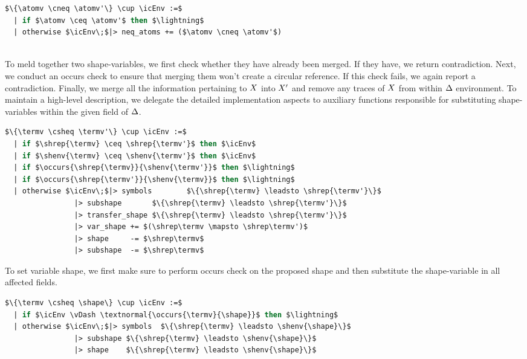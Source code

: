 \documentclass[english, mgr]{iithesis}
\renewcommand{\tt}[1]{\texttt{\small{#1}}}
\begin{document}
\begin{minipage}{0.6\textwidth}
\begin{lstlisting}[mathescape, language=OCaml]
$\{\atomv \cneq \atomv'\} \cup \icEnv :=$
  | if $\atomv \ceq \atomv'$ then $\lightning$
  | otherwise $\icEnv\;$|> neq_atoms += ($\atomv \cneq \atomv'$)
\end{lstlisting}
\end{minipage}
\\
To meld together two shape-variables, we first check whether they have already been merged. If they have, we return contradiction.
Next, we conduct an occurs check to ensure that merging them won't create a circular reference. If this check fails, we again report a contradiction.
Finally, we merge all the information pertaining to $X$ into $X'$ and
remove any traces of $X$ from within $\Delta$ environment.
To maintain a high-level description, we delegate the detailed implementation aspects to auxiliary functions responsible for substituting shape-variables within the given field of $\Delta$.
\begin{lstlisting}[mathescape, language=OCaml]
$\{\termv \csheq \termv'\} \cup \icEnv :=$
  | if $\shrep{\termv} \ceq \shrep{\termv'}$ then $\icEnv$
  | if $\shenv{\termv} \ceq \shenv{\termv'}$ then $\icEnv$
  | if $\occurs{\shrep{\termv}}{\shenv{\termv'}}$ then $\lightning$
  | if $\occurs{\shrep{\termv'}}{\shenv{\termv}}$ then $\lightning$
  | otherwise $\icEnv\;$|> symbols        $\{\shrep{\termv} \leadsto \shrep{\termv'}\}$
                |> subshape       $\{\shrep{\termv} \leadsto \shrep{\termv'}\}$
                |> transfer_shape $\{\shrep{\termv} \leadsto \shrep{\termv'}\}$
                |> var_shape += $(\shrep\termv \mapsto \shrep\termv')$
                |> shape     -= $\shrep\termv$
                |> subshape  -= $\shrep\termv$
\end{lstlisting}
To set variable shape, we first make sure to perform occurs check on the proposed shape
and then substitute the shape-variable in all affected fields.
\begin{lstlisting}[mathescape, language=OCaml]
$\{\termv \csheq \shape\} \cup \icEnv :=$
  | if $\icEnv \vDash \textnormal{\occurs{\termv}{\shape}}$ then $\lightning$
  | otherwise $\icEnv\;$|> symbols  $\{\shrep{\termv} \leadsto \shenv{\shape}\}$
                |> subshape $\{\shrep{\termv} \leadsto \shenv{\shape}\}$
                |> shape    $\{\shrep{\termv} \leadsto \shenv{\shape}\}$
\end{lstlisting}
\newcommand{\Assumptions}{\tt{assumptions}}
\end{document}
